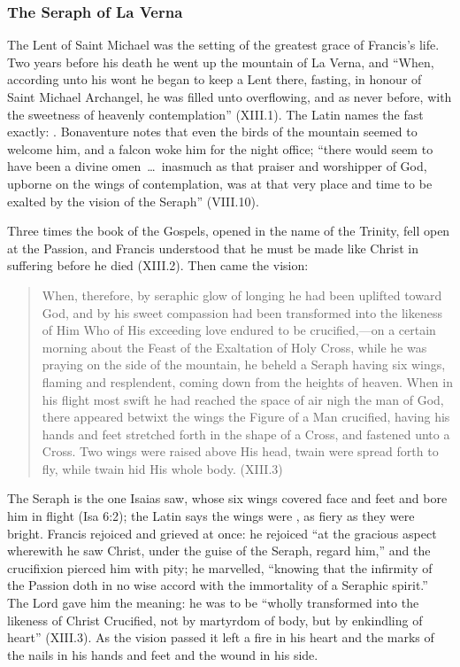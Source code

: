 \subsubsection{The Seraph of La Verna}

The Lent of Saint Michael was the setting of the greatest grace of
Francis's life. Two years before his death he went up the mountain of La
Verna, and ``When, according unto his wont he began to keep a Lent there,
fasting, in honour of Saint Michael Archangel, he was filled unto
overflowing, and as never before, with the sweetness of heavenly
contemplation'' (XIII.1). The Latin names the fast exactly:
. Bonaventure notes that even the birds of the mountain seemed to
welcome him, and a falcon woke him for the night office; ``there would seem
to have been a divine omen~\dots\ inasmuch as that praiser and worshipper of
God, upborne on the wings of contemplation, was at that very place and time
to be exalted by the vision of the Seraph'' (VIII.10).

Three times the book of the Gospels, opened in the name of the Trinity, fell
open at the Passion, and Francis understood that he must be made like
Christ in suffering before he died (XIII.2). Then came the vision:
\begin{quote}
When, therefore, by seraphic glow of longing he had been uplifted toward
God, and by his sweet compassion had been transformed into the likeness of
Him Who of His exceeding love endured to be crucified,---on a certain
morning about the Feast of the Exaltation of Holy Cross, while he was
praying on the side of the mountain, he beheld a Seraph having six wings,
flaming and resplendent, coming down from the heights of heaven. When in
his flight most swift he had reached the space of air nigh the man of God,
there appeared betwixt the wings the Figure of a Man crucified, having his
hands and feet stretched forth in the shape of a Cross, and fastened unto a
Cross. Two wings were raised above His head, twain were spread forth to
fly, while twain hid His whole body. (XIII.3)
\end{quote}
The Seraph is the one Isaias saw, whose six wings covered face and feet and
bore him in flight (Isa 6:2); the Latin says the wings were , as fiery as they were bright. Francis rejoiced and
grieved at once: he rejoiced ``at the gracious aspect wherewith he saw
Christ, under the guise of the Seraph, regard him,'' and the crucifixion
pierced him with pity; he marvelled, ``knowing that the infirmity of the
Passion doth in no wise accord with the immortality of a Seraphic spirit.''
The Lord gave him the meaning: he was to be ``wholly transformed into the
likeness of Christ Crucified, not by martyrdom of body, but by enkindling of
heart'' (XIII.3). As the vision passed it left a fire in his heart and the
marks of the nails in his hands and feet and the wound in his side.

